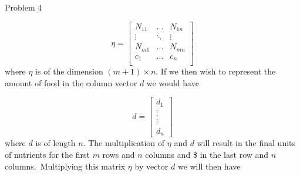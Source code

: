 \begin{problem}{Problem 4}
\begin{highlight}[Solution]
        \setcounter{equation}{0}
        \begin{equation}
            \eta = 
            \begin{bmatrix}
                N_{11} & \dots & N_{1n} \\
                \vdots & \ddots & \vdots \\
                N_{m1} & \dots & N_{mn} \\
                c_{1} & \dots & c_{n} \\
            \end{bmatrix}
        \end{equation}
        where $\eta$ is of the dimension $(m + 1) \times n$. If we then wish to represent the amount of food in the column vector $d$ we would have

        \begin{equation}
            d =
            \begin{bmatrix}
                d_{1} \\
                \vdots \\
                \vdots \\
                d_{n}
            \end{bmatrix}
        \end{equation}
        where $d$ is of length $n$. The multiplication of $\eta$ and $d$ will result in the final units of nutrients for the first $m$ rows and $n$ columns and \$ in the last row and $n$ columns.\
        Multiplying this matrix $\eta$ by vector $d$ we will then have


\end{highlight}
\end{problem}
